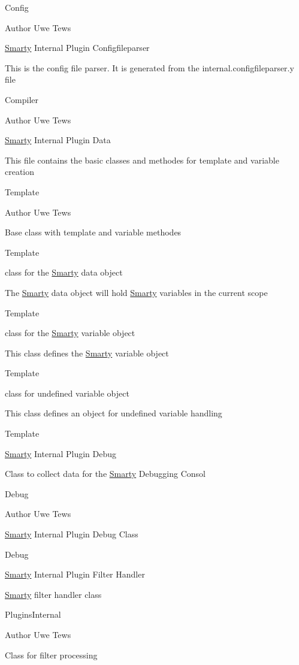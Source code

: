 Config \begin{DoxyAuthor}{Author}
Uwe Tews
\end{DoxyAuthor}
\hyperlink{class_smarty}{Smarty} Internal Plugin Configfileparser

This is the config file parser. It is generated from the internal.\+configfileparser.\+y file

Compiler \begin{DoxyAuthor}{Author}
Uwe Tews
\end{DoxyAuthor}
\hyperlink{class_smarty}{Smarty} Internal Plugin Data

This file contains the basic classes and methodes for template and variable creation

Template \begin{DoxyAuthor}{Author}
Uwe Tews
\end{DoxyAuthor}
Base class with template and variable methodes

Template

class for the \hyperlink{class_smarty}{Smarty} data object

The \hyperlink{class_smarty}{Smarty} data object will hold \hyperlink{class_smarty}{Smarty} variables in the current scope

Template

class for the \hyperlink{class_smarty}{Smarty} variable object

This class defines the \hyperlink{class_smarty}{Smarty} variable object

Template

class for undefined variable object

This class defines an object for undefined variable handling

Template

\hyperlink{class_smarty}{Smarty} Internal Plugin Debug

Class to collect data for the \hyperlink{class_smarty}{Smarty} Debugging Consol

Debug \begin{DoxyAuthor}{Author}
Uwe Tews
\end{DoxyAuthor}
\hyperlink{class_smarty}{Smarty} Internal Plugin Debug Class

Debug

\hyperlink{class_smarty}{Smarty} Internal Plugin Filter Handler

\hyperlink{class_smarty}{Smarty} filter handler class

Plugins\+Internal \begin{DoxyAuthor}{Author}
Uwe Tews
\end{DoxyAuthor}
Class for filter processing

